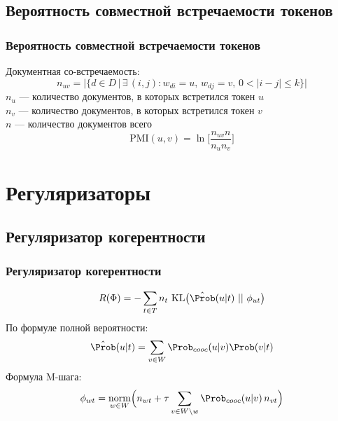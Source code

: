 \documentclass[unicode]{beamer}
\begin{document}
\subsection{Вероятность совместной встречаемости токенов}
\begin{frame}
\frametitle{Вероятность совместной встречаемости токенов}
Документная со-встречаемость:
$$n_{uv} = \Bigg| \Big\{ d \in D \, \big| \, \exists \, (i, j): w_{di} = u, \, w_{dj} = v, \, 0 < |i - j| \leq k \Big\} \Bigg|$$
$n_u$ --- количество документов, в которых встретился токен $u$ \\
$n_v$ --- количество документов, в которых встретился токен $v$ \\
$n$ --- количество документов всего
$$\text{PMI}(u, v) = \ln \Big[ \frac{n_{uv} n}{n_u n_v} \Big]$$    
\end{frame}

\section{Регуляризаторы}

\subsection{Регуляризатор когерентности}
\begin{frame}
\frametitle{Регуляризатор когерентности}
    $$R(\Phi) = -\sum_{t \in T} n_t ~\text{KL} \big( \hat{\Prob}(u | t) ~||~ \phi_{ut} \big)$$
    По формуле полной вероятности:
    $$\hat{\Prob}(u | t) = \sum_{v \in W} \Prob_{cooc}(u | v) \Prob(v | t)$$
    Формула M-шага:
    $$\phi_{wt} = \underset{w \in W}{\text{norm}} \Big( n_{wt} + \tau \sum_{v \in W \backslash w} \Prob_{cooc}(u | v) \, n_{vt} \Big)$$
\end{frame}


\end{document}

